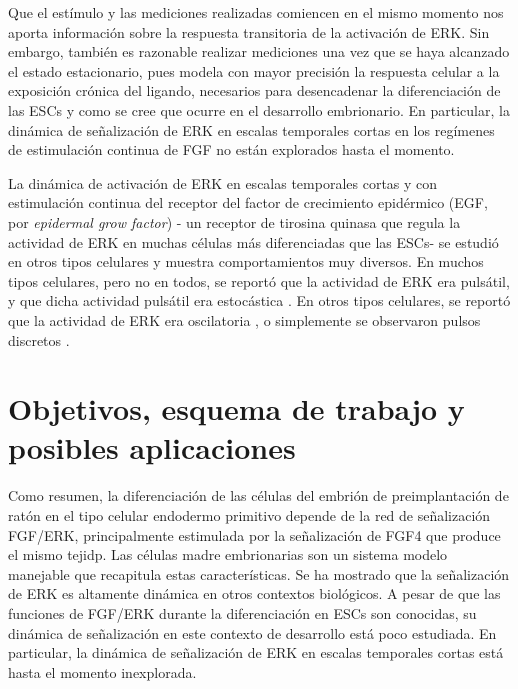 \documentclass[./main.tex]{subfiles}
\begin{document}
Que el estímulo y las mediciones realizadas comiencen en el mismo momento nos aporta información sobre la respuesta transitoria de la activación de ERK. Sin embargo, también es razonable realizar mediciones una vez que se haya alcanzado el estado estacionario, pues modela con mayor precisión la respuesta celular a la exposición crónica del ligando, necesarios para desencadenar la diferenciación de las ESCs y como se cree que ocurre en el desarrollo embrionario. En particular, la dinámica de señalización de ERK en escalas temporales cortas en los regímenes de estimulación continua de FGF no están explorados hasta el momento. 


La dinámica de activación de ERK en escalas temporales cortas y con estimulación continua del receptor del factor de crecimiento epidérmico (EGF, por \textit{epidermal grow factor}) - un receptor de tirosina quinasa que regula la actividad de ERK en muchas células más diferenciadas que las ESCs- se estudió en otros tipos celulares y muestra comportamientos muy diversos. En muchos tipos celulares, pero no en todos, se reportó que la actividad de ERK era pulsátil, y que dicha actividad pulsátil era estocástica \cite{Aoki2013}. En otros tipos celulares, se reportó que la actividad de ERK era oscilatoria \cite{Shankaran2009}, o simplemente se observaron pulsos discretos \cite{Albeck2013}.





\section{Objetivos, esquema de trabajo y posibles aplicaciones}


Como resumen, la diferenciación de las células del embrión de preimplantación de ratón en el tipo celular endodermo primitivo depende de la red de señalización FGF/ERK, principalmente estimulada por la señalización de FGF4 que produce el mismo tejidp. Las células madre embrionarias son un sistema modelo manejable que recapitula estas características. Se ha mostrado que la señalización de ERK es altamente dinámica en otros contextos biológicos. A pesar de que las funciones de FGF/ERK durante la diferenciación en ESCs son conocidas, su dinámica de señalización en este contexto de desarrollo está poco estudiada. En particular, la dinámica de señalización de ERK en escalas temporales cortas está hasta el momento inexplorada.
\end{document}
